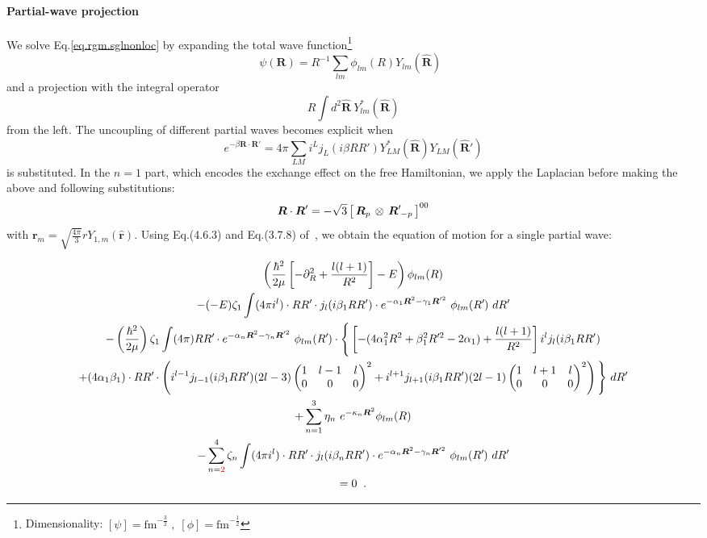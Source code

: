 \documentclass
[aps,nofootinbib,prl,showpacs,twocolumn,groupedaddress,superscriptaddress]
{revtex4}
\newcommand*{\mprime}{^{\prime}\mkern-1.2mu}
\newcommand{\red}[1]{\textcolor{red}{#1}}
\newcommand{\la}{\label}
\newcommand{\be}{\begin{equation}}
\newcommand{\ee}{\end{equation}}
\newcommand{\ve}[1]{\ensuremath{\boldsymbol{#1}}}
\newcommand{\coup}[3]{\left[\,#1\,\otimes\,#2\,\right]^{#3}}
\newcommand{\threej}[6]{ \begin{pmatrix}
   #1 & #2 & #3 \\
   #4 & #5 & #6 
  \end{pmatrix}}
\begin{document}
\paragraph{Partial-wave projection} We solve Eq.\eqref{eq.rgm.sglnonloc} by expanding
the total wave function\footnote{Dimensionality: $[\psi]=\text{fm}^{-\frac{3}{2}}\;,\;[\phi]=\text{fm}^{-\frac{1}{2}}$}
\be
\psi(\ve{R})=R^{-1}\sum_{lm}\phi_{lm}(R)Y_{lm}(\hat{\ve{R}})\;\;
\ee
and a projection with the integral operator
\be
R\int d^2\hat{\ve{R}}~Y^*_{lm}(\hat{\ve{R}})
\ee
from the left. The uncoupling of different partial waves becomes explicit when
\be
e^{-\beta\ve{R}\cdot\ve{R}'}=4\pi\sum_{LM}i^Lj_L(i\beta RR')Y^*_{LM}(\hat{\ve{R}})Y_{LM}(\hat{\ve{R}}')
\ee
is substituted. In the $n=1$ part, which encodes the exchange effect on the free
Hamiltonian, we apply the Laplacian before making the above and following
substitutions:
\be
\ve{R}\cdot\ve{R}'=-\sqrt{3}\coup{\ve{R}_p}{\ve{R}\mprime_{-p}}{00}
\ee
with $\ve{r}_m=\sqrt{\frac{4\pi}{3}}rY_{1,m}(\hat{\ve{r}})$. Using Eq.(4.6.3) and
Eq.(3.7.8) of~\cite{Edmonds}, we obtain the equation of motion for a single
partial wave:
\begin{widetext}
\begin{subequations}\la{eq.rgm.sglnonloc.pw}
\begin{gather}
\left(\frac{\hbar^2}{2\mu}\left[-\partial^2_R+\frac{l(l+1)}{R^2}\right]-E\right)
\phi_{lm}(R)\\
-(-E)\zeta_1\int
(4\pi i^l)\cdot RR\mprime\cdot j_l(i\beta_1 RR')\cdot
 e^{-\alpha_1\ve{R}^2-\gamma_1\ve{R}'^2}~\phi_{lm}(R\mprime)~dR\mprime
 \la{eq.rgm.sglnonloc.pw.Eex}\\
-\left(\frac{\hbar^2}{2\mu}\right)\zeta_1\int
(4\pi) RR\mprime\cdot e^{-\alpha_n\ve{R}^2-\gamma_n\ve{R}'^2}~\phi_{lm}(R\mprime)
\cdot\Bigg\lbrace
\left[-(4\alpha_1^2R^2+\beta_1^2R\mprime^2-2\alpha_1)+\frac{l(l+1)}{R^2}\right]
 i^l j_{l}(i\beta_1 RR')\nonumber\\
+(4\alpha_1\beta_1)\cdot RR\mprime\cdot
 \left(i^{l-1} j_{l-1}(i\beta_1 RR') (2l-3)
 \threej{1}{l-1}{l}{0}{0}{0}^2+
 i^{l+1} j_{l+1}(i\beta_1 RR') (2l-1)
 \threej{1}{l+1}{l}{0}{0}{0}^2\right)\Bigg\rbrace
~dR\mprime\la{eq.rgm.sglnonloc.pw.tex}\\
+\sum_{n=1}^3\eta_n~e^{-\kappa_n\ve{R}^2}\phi_{lm}(R)\la{eq.rgm.sglnonloc.pw.t}\\
-\sum_{n=\red{2}}^4\zeta_n\int
(4\pi i^l)\cdot RR\mprime\cdot j_l(i\beta_n RR')\cdot 
e^{-\alpha_n\ve{R}^2-\gamma_n\ve{R}'^2}~\phi_{lm}(R\mprime)~dR\mprime\la{eq.rgm.sglnonloc.pw.noloc}\\
 =0\;\;.\nonumber
\end{gather}
\end{subequations}
\end{widetext}
\end{document}
